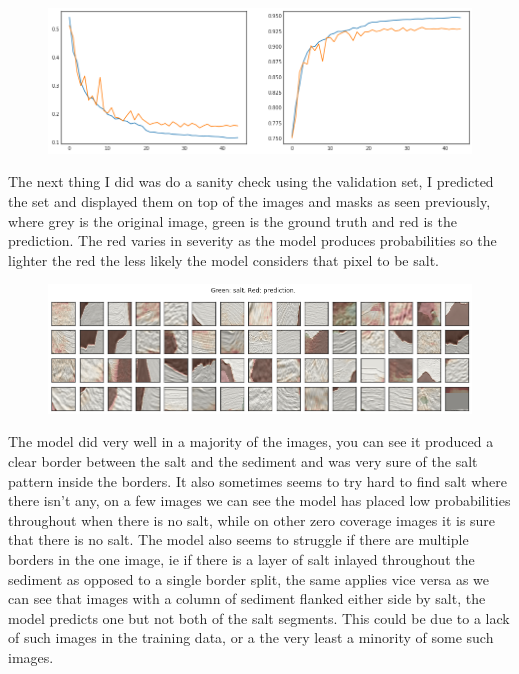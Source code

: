 \documentclass[11pt]{article}
\makeatletter
\def\maxwidth{\ifdim\Gin@nat@width>\linewidth\linewidth
    \else\Gin@nat@width\fi}
\let\Oldincludegraphics\includegraphics
\renewcommand{\includegraphics}[1]{\Oldincludegraphics[width=.8\maxwidth]{#1}}
\makeatother
\begin{document}
\begin{figure}
\centering
\includegraphics{pictures/validation.png}
\caption{}
\end{figure}

The next thing I did was do a sanity check using the validation set, I
predicted the set and displayed them on top of the images and masks as
seen previously, where grey is the original image, green is the ground
truth and red is the prediction. The red varies in severity as the model
produces probabilities so the lighter the red the less likely the model
considers that pixel to be salt.

\begin{figure}
\centering
\includegraphics{pictures/predictions.png}
\caption{}
\end{figure}

The model did very well in a majority of the images, you can see it
produced a clear border between the salt and the sediment and was very
sure of the salt pattern inside the borders. It also sometimes seems to
try hard to find salt where there isn't any, on a few images we can see
the model has placed low probabilities throughout when there is no salt,
while on other zero coverage images it is sure that there is no salt.
The model also seems to struggle if there are multiple borders in the
one image, ie if there is a layer of salt inlayed throughout the
sediment as opposed to a single border split, the same applies vice
versa as we can see that images with a column of sediment flanked either
side by salt, the model predicts one but not both of the salt segments.
This could be due to a lack of such images in the training data, or a
the very least a minority of some such images.
\end{document}
